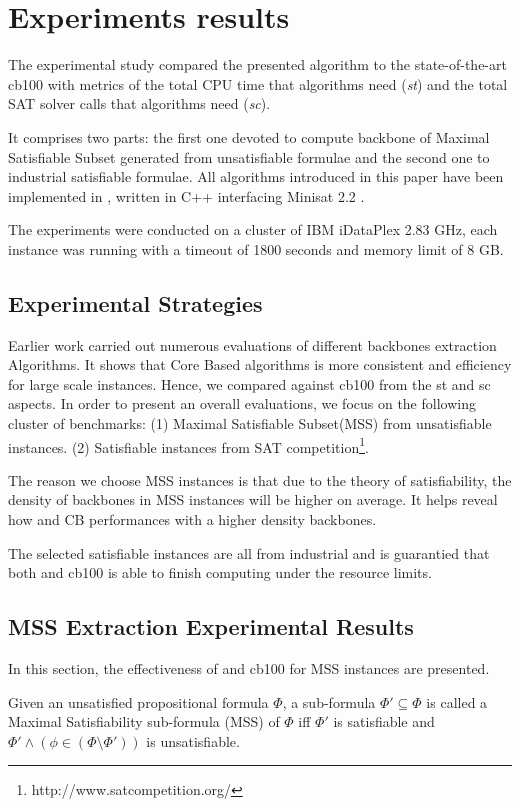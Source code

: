 \section{Experiments results}\label{sec:expr}

The experimental study compared the presented \tool algorithm to the state-of-the-art cb100 with metrics of the total CPU time that algorithms need (\emph{st}) and the total SAT solver calls that algorithms need (\emph{sc}).

It comprises two parts: the first one devoted to compute backbone of Maximal Satisfiable Subset generated from unsatisfiable formulae and the second one to industrial satisfiable formulae. All algorithms introduced in this paper have been implemented in \tool, written in C++ interfacing Minisat 2.2 \cite{MINISAT}. 

The experiments were conducted on a cluster of IBM iDataPlex 2.83 GHz, each instance was running with a timeout of 1800 seconds and memory limit of 8 GB.

\subsection{Experimental Strategies}

Earlier work\cite{JLM15} carried out numerous evaluations of different backbones extraction Algorithms. It shows that Core Based algorithms is more consistent and efficiency for large scale instances. Hence, we compared \tool against cb100 from the st and sc aspects.
In order to present an overall evaluations, we focus on the following cluster of benchmarks: (1) Maximal Satisfiable Subset(MSS) from unsatisfiable instances. (2) Satisfiable instances from SAT competition\footnote{http://www.satcompetition.org/}.

The reason we choose MSS instances is that due to the theory of satisfiability, the density of backbones in MSS instances will be higher on average. It helps reveal how \tool and CB performances with a higher density backbones.

The selected satisfiable instances are all from industrial and is guarantied that both \tool and cb100 is able to finish computing under the resource limits.

\subsection{MSS Extraction Experimental Results}
In this section, the effectiveness of \tool and cb100 for MSS instances are presented.
\begin{definition}
Given an unsatisfied propositional formula $\Phi$, a sub-formula $\Phi'\subseteq\Phi$ is called a Maximal Satisfiability sub-formula (MSS) of $\Phi$ iff $\Phi'$ is satisfiable and $\Phi'\wedge(\phi\in(\Phi\setminus\Phi'))$ is unsatisfiable.
\end{definition}


